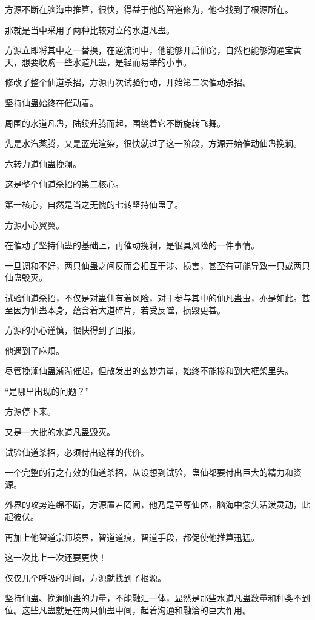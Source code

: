 \begin{this_body}
方源不断在脑海中推算，很快，得益于他的智道修为，他查找到了根源所在。

那就是当中采用了两种比较对立的水道凡蛊。

方源立即将其中之一替换，在逆流河中，他能够开启仙窍，自然也能够沟通宝黄天，想要收购一些水道凡蛊，是轻而易举的小事。

修改了整个仙道杀招，方源再次试验行动，开始第二次催动杀招。

坚持仙蛊始终在催动着。

周围的水道凡蛊，陆续升腾而起，围绕着它不断旋转飞舞。

先是水汽蒸腾，又是蓝光渲染，很快就过了这一阶段，方源开始催动仙蛊挽澜。

六转力道仙蛊挽澜。

这是整个仙道杀招的第二核心。

第一核心，自然是当之无愧的七转坚持仙蛊了。

方源小心翼翼。

在催动了坚持仙蛊的基础上，再催动挽澜，是很具风险的一件事情。

一旦调和不好，两只仙蛊之间反而会相互干涉、损害，甚至有可能导致一只或两只仙蛊毁灭。

试验仙道杀招，不仅是对蛊仙有着风险，对于参与其中的仙凡蛊虫，亦是如此。甚至因为仙蛊本身，蕴含着大道碎片，若受反噬，损毁更甚。

方源的小心谨慎，很快得到了回报。

他遇到了麻烦。

尽管挽澜仙蛊渐渐催起，但散发出的玄妙力量，始终不能掺和到大框架里头。

“是哪里出现的问题？”

方源停下来。

又是一大批的水道凡蛊毁灭。

试验仙道杀招，必须付出这样的代价。

一个完整的行之有效的仙道杀招，从设想到试验，蛊仙都要付出巨大的精力和资源。

外界的攻势连绵不断，方源置若罔闻，他乃是至尊仙体，脑海中念头活泼灵动，此起彼伏。

再加上他智道宗师境界，智道道痕，智道手段，都促使他推算迅猛。

这一次比上一次还要更快！

仅仅几个呼吸的时间，方源就找到了根源。

坚持仙蛊、挽澜仙蛊的力量，不能融汇一体，显然是那些水道凡蛊数量和种类不到位。这些凡蛊就是在两只仙蛊中间，起着沟通和融洽的巨大作用。


\end{this_body}
